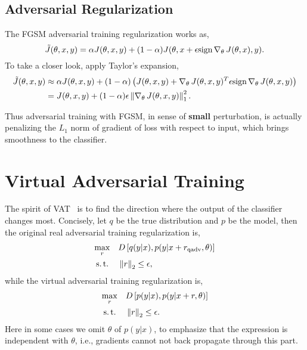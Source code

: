 \documentclass{article}
\begin{document}
\subsection{Adversarial Regularization}
The FGSM adversarial training regularization works as,
\begin{equation*}
    \tilde{J}(\theta, x, y) = \alpha J(\theta, x, y) + (1-\alpha)J(\theta, x+\epsilon\text{sign}\operatorname{\nabla}_{\theta} J(\theta, x), y).
\end{equation*}
To take a closer look, apply Taylor's expansion,
\begin{equation*}
\begin{aligned}
\tilde{J}(\theta, x, y) &\approx \alpha J(\theta, x, y) + (1-\alpha) \left( J(\theta, x, y) + \operatorname{\nabla}_{\theta} J(\theta, x, y)^T \epsilon\text{sign}\operatorname{\nabla}_{\theta} J(\theta, x, y) \right) \\
&= J(\theta, x, y) + (1-\alpha)\epsilon \left\|\operatorname{\nabla}_{\theta} J(\theta, x, y)\right\|_1^2.
\end{aligned}
\end{equation*}

Thus adversarial training with FGSM, in sense of \textbf{small} perturbation, is actually penalizing the $L_1$ norm of gradient of loss with respect to input, which brings smoothness to the classifier. 

\section{Virtual Adversarial Training}
The spirit of VAT~\cite{miyato2017virtual} is to find the direction where the output of the classifier changes most.
Concisely, let $q$ be the true distribution and $p$ be the model, then the original real adversarial training regularization is,
\begin{equation*}
\begin{aligned}
    \max_{r}\quad & D\left[q(y|x), p(y|x+r_{\text{qadv}}, \theta)\right]\\
    \operatorname{s.t.\,}\quad & \left\|r\right\|_2 \le \epsilon,
\end{aligned}
\end{equation*}
while the virtual adversarial training regularization is,
\begin{equation*}
\begin{aligned}
    \max_{r}\quad & D\left[p(y|x), p(y|x+r, \theta)\right]\\
    \operatorname{s.t.\,}\quad & \left\|r\right\|_2 \le \epsilon.
\end{aligned}
\end{equation*}
Here in some cases we omit $\theta$ of $p(y|x)$, to emphasize that the expression is independent with $\theta$, i.e., gradients cannot not back propagate through this part.
\end{document}
